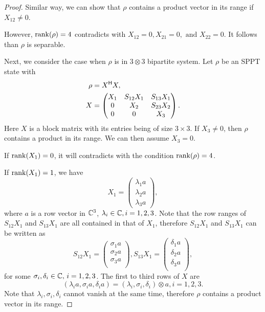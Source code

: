 \begin{proof}
  Similar way, we can show that $\rho$  contains a product vector in its range if $X_{12}\neq 0$.


  However, $\mathrm{rank} (\rho)=4$ contradicts with  $X_{12}=0,X_{21}=0, \text{ and } X_{22}=0$. It follows than $\rho$ is separable.

  Next, we consider the case when $\rho$ is in $3\otimes 3$ bipartite system.  Let $\rho$ be an SPPT state with
  \begin{equation*}
    \begin{split}
      \rho& = X^{\mathsf{H}}{X},\\
      X & =
      \begin{pmatrix}
        X_1 & S_{12} X_1 & S_{13}X_1 \\
        0 &X_2 &S_{23 }X_2\\
        0 & 0 & X_3
      \end{pmatrix}.
    \end{split}
  \end{equation*}
  Here $X$ is a block matrix with its entries being of size $3\times 3$.
  If $X_3\neq 0 $, then $\rho$ contains a product in its range. We can then assume  $X_3 =0$.

  If $\mathrm{rank} (X_1)=0$, it will contradicts with the condition $\mathrm{rank} (\rho)=4$.

  If $\mathrm{rank} (X_1) = 1$, we have
  \begin{equation}
    \label{multiSPPTfinal2:eq:3}
    X_1 =
    \begin{pmatrix}
      \lambda_1 a\\
      \lambda_2 a\\
      \lambda_3 a
    \end{pmatrix},
  \end{equation}
  where $a$ is  a row vector in $\mathbb{C}^3$, $\lambda_i\in\mathbb{C},i=1,2,3$.
  Note that the row ranges of $S_{12}X_1$ and $S_{13}X_1$ are all contained in that of $X_1$, therefore $S_{12}X_1$ and
  $S_{13}X_{1}$ can be written as 
  \begin{equation*}    
    S_{12}X_1 =
    \begin{pmatrix}
      \sigma_1 a\\
      \sigma_2 a\\
      \sigma_3 a\\
    \end{pmatrix},    
    S_{13}X_1 =
    \begin{pmatrix}
      \delta_1 a\\
      \delta_2 a\\
      \delta_3 a\\
    \end{pmatrix},
  \end{equation*}
  for some $\sigma_i,\delta_i\in\mathbb{C},\,i=1,2,3$. The first to third rows of $X$ are
  \begin{equation}
    \label{multiSPPTfinal2:eq:4}
    (\lambda_i a,\sigma_ia,\delta_i a) = (\lambda_i,\sigma_i,\delta_i)\otimes a,i=1,2,3.
  \end{equation}
  Note that  $\lambda_i,\sigma_i,\delta_i$ cannot vanish at the same time, therefore $\rho$ contains
  a product vector in its range.
  

\end{proof}
